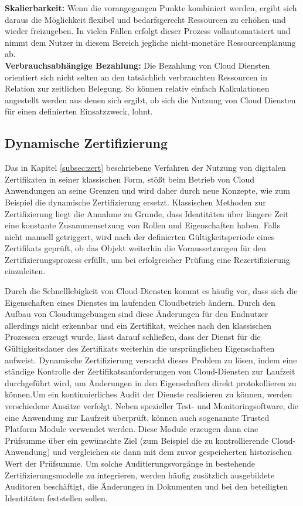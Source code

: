 \documentclass[
book,
a4paper,   
titlepage,  
halfparskip,
12pt        
]{scrartcl}
\begin{document}
\begin{onehalfspacing}
\textbf{Skalierbarkeit:} Wenn die vorangegangen Punkte kombiniert werden, ergibt sich daraus die Möglichkeit flexibel und bedarfsgerecht Ressourcen zu erhöhen und wieder freizugeben. In vielen Fällen erfolgt dieser Prozess vollautomatisiert und nimmt dem Nutzer in diesem Bereich jegliche nicht-monetäre Ressourcenplanung ab.\cite[S. 9]{cloudsec}\\
\textbf{Verbrauchsabhängige Bezahlung:} Die Bezahlung von Cloud Diensten orientiert sich nicht selten an den tatsächlich verbrauchten Ressourcen in Relation zur zeitlichen Belegung. So können relativ einfach Kalkulationen angestellt werden aus denen sich ergibt, ob sich die Nutzung von Cloud Diensten für einen definierten Einsatzzweck, lohnt.\cite[S. 9]{cloudsec}\\

\subsection{Dynamische Zertifizierung} 
Das in Kapitel \vref{subsec:zert} beschriebene Verfahren der Nutzung von digitalen Zertifikaten in seiner klassischen Form, stößt beim Betrieb von Cloud Anwendungen an seine Grenzen und wird daher durch neue Konzepte, wie zum Beispiel die dynamische Zertifizierung ersetzt. Klassischen Methoden zur Zertifizierung liegt die Annahme zu Grunde, dass Identitäten über längere Zeit eine konstante Zusammensetzung von Rollen und Eigenschaften haben. Falls nicht manuell getriggert, wird nach der definierten Gültigkeitsperiode eines Zertifikats geprüft, ob das Objekt weiterhin die Voraussetzungen für den Zertifizierungsprozess erfüllt, um bei erfolgreicher Prüfung eine Rezertifizierung einzuleiten.\cite{cloudabs}

Durch die Schnelllebigkeit von Cloud-Diensten kommt es häufig vor, dass sich die Eigenschaften eines Dienstes im laufenden Cloudbetrieb ändern. Durch den Aufbau von Cloudumgebungen sind diese Änderungen für den Endnutzer allerdings nicht erkennbar und ein Zertifikat, welches nach den klassischen Prozessen erzeugt wurde, lässt darauf schließen, dass der Dienst für die Gültigkeitsdauer des Zertifikats weiterhin die ursprünglichen Eigenschaften aufweist. Dynamische Zertifizierung versucht dieses Problem zu lösen, indem eine ständige Kontrolle der Zertifikatsanforderungen von Cloud-Diensten zur Laufzeit durchgeführt wird, um Änderungen in den Eigenschaften direkt protokollieren zu können.\newline Um ein kontinuierliches Audit der Dienste realisieren zu können, werden verschiedene Ansätze verfolgt. Neben spezieller Test- und Monitoringsoftware, die eine Anwendung zur Laufzeit überprüft, können auch sogenannte Trusted Platform Module verwendet werden. Diese Module erzeugen dann eine Prüfsumme über ein gewünschte Ziel (zum Beispiel die zu kontrollierende Cloud-Anwendung) und vergleichen sie dann mit dem zuvor gespeicherten historischen Wert der Prüfsumme. Um solche Auditierungsvorgänge in bestehende Zertifizierungsmodelle zu integrieren, werden häufig zusätzlich ausgebildete Auditoren beschäftigt, die Änderungen in Dokumenten und bei den beteiligten Identitäten feststellen sollen.\cite[S. 114ff]{cloudsec}


\end{onehalfspacing}
\end{document}
